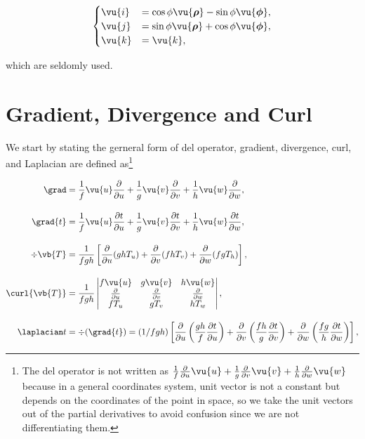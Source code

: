 \documentclass[english,a4paper,12pt]{report}
\begin{document}
\begin{equation}
    \begin{cases}
        \vu{i} &= \cos \phi  \vu{\boldsymbol{\rho } } - \sin \phi \vu{\boldsymbol{\phi } }, \\
        \vu{j} &= \sin \phi \vu{\boldsymbol{\rho } } + \cos \phi \vu{\boldsymbol{\phi } }, \\
        \vu{k} &= \vu{k},
        \end{cases}
\end{equation}

which are seldomly used.











\section{Gradient, Divergence and Curl} 

We start by stating the gerneral form of del operator, gradient, divergence, curl, and Laplacian are defined as\footnote{The del operator is not written as \(\frac{1}{f} \frac{\partial}{\partial u}\vu{u}  + \frac{1}{g} \frac{\partial}{\partial v}\vu{v} + \frac{1}{h} \frac{\partial}{\partial w}\vu{w}\) because in a general coordinates system, unit vector is not a constant but depends on the coordinates of the point in space, so we take the unit vectors out of the partial derivatives to avoid confusion since we are not differentiating them.}

\begin{equation} \label{all} 
\begin{aligned}
\grad &= \frac{1}{f}\vu{u}\frac{\partial}{\partial u} + \frac{1}{g}\vu{v}\frac{\partial}{\partial v} + \frac{1}{h}\vu{w}\frac{\partial}{\partial w}, \\[10pt]
\grad{t }&= \frac{1}{f} \vu{u} \frac{\partial t}{\partial u} 
+ \frac{1}{g} \vu{v}\frac{\partial t}{\partial v}  
+ \frac{1}{h} \vu{w}\frac{\partial t}{\partial w} , \\[10pt]
\div{\vb{T}}  &= \frac{1}{fgh} \left[ 
\frac{\partial}{\partial u} (ghT_{u} ) + 
\frac{\partial}{\partial v} (fhT_{v} )+ 
\frac{\partial}{\partial w} (fgT_{h} ) \right], \\[10pt]
\curl{\vb{T} }  &= \frac{1}{fgh} 
\begin{vmatrix} 
f \vu{u} & g \vu{v} & h \vu{w} \\ 
\frac{\partial}{\partial u} & \frac{\partial}{\partial v} & \frac{\partial}{\partial w} \\ 
fT_{u}  & g T_{v}  & h T_{w}  
\end{vmatrix}, \\[10pt]
\laplacian t &= \div{(\grad{t} )} =  (1 / fgh) \left[
\frac{\partial}{\partial u} \left( \frac{gh}{f} \frac{\partial t}{\partial u} \right) + 
\frac{\partial}{\partial v} \left( \frac{fh}{g} \frac{\partial t}{\partial v} \right) + 
\frac{\partial}{\partial w} \left( \frac{fg}{h} \frac{\partial t}{\partial w} \right)
\right],
\end{aligned}
\end{equation}
\end{document}
